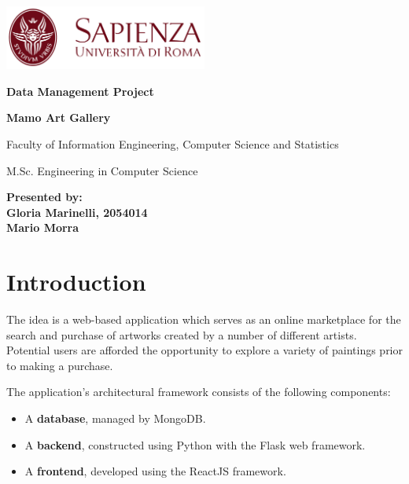 \documentclass[a4paper,12pt]{article}
\begin{document}
\begin{titlepage}
    \begingroup
    \centering
    \includegraphics[width=0.5\textwidth]{sapienza.png}\par\vspace{1cm}

    {\bfseries\large Data Management Project \par}\vspace{0.5cm}

    {\bfseries\LARGE Mamo Art Gallery \par}\vspace{1cm}

    {\small Faculty of Information Engineering, Computer Science and Statistics
        \par}\vspace{0.1cm}

    {\small
        M.Sc. Engineering in Computer Science
        \par}\vspace{10cm}

    \endgroup

    {\textbf{\small
            Presented by: \\
            Gloria Marinelli, 2054014 \\
            Mario Morra}}\vfill

\end{titlepage}

\tableofcontents
\newpage

\section{Introduction}
\justify
The idea is a web-based application which serves as an online marketplace for the search and purchase of artworks created by a number of different artists. Potential users are afforded the opportunity to explore a variety of paintings prior to making a purchase.

The application's architectural framework consists of the following components:

\begin{itemize}
    \item A \textbf{database}, managed by MongoDB.
    \item A \textbf{backend}, constructed using Python with the Flask web framework.
    \item A \textbf{frontend}, developed using the ReactJS framework.
\end{itemize}
\end{document}
